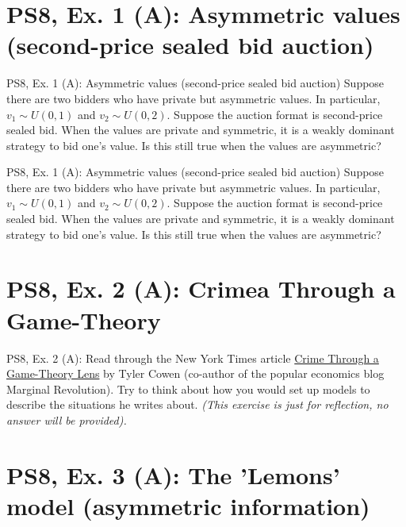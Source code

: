 \section{PS8, Ex. 1 (A): Asymmetric values (second-price sealed bid auction)}

\begin{frame}{PS8, Ex. 1 (A): Asymmetric values (second-price sealed bid auction)}
    Suppose there are two bidders who have private but asymmetric values. In particular, $v_1\sim U(0, 1)$ and $v_2\sim U(0, 2)$. Suppose the auction format is second-price sealed bid. When the values are private and symmetric, it is a weakly dominant strategy to bid one’s value. Is this still true when the values are asymmetric?
\end{frame}

\begin{frame}{PS8, Ex. 1 (A): Asymmetric values (second-price sealed bid auction)}
    Suppose there are two bidders who have private but asymmetric values. In particular, $v_1\sim U(0, 1)$ and $v_2\sim U(0, 2)$. Suppose the auction format is second-price sealed bid. When the values are private and symmetric, it is a weakly dominant strategy to bid one’s value. Is this still true when the values are asymmetric?
    \begin{multicols}{2}
      \vfill\null\columnbreak
      \vfill\null
    \end{multicols}
\end{frame}



\section{PS8, Ex. 2 (A): Crimea Through a Game-Theory }

\begin{frame}{PS8, Ex. 2 (A): }
    Read through the New York Times article \href{https://www.nytimes.com/2014/03/16/business/crimea-through-a-game-theory-lens.html}{Crime Through a Game-Theory Lens} by Tyler Cowen (co-author of the popular economics blog Marginal Revolution). Try to think about how you would set up models to describe the situations he writes about. \textit{(This exercise is just for reflection, no answer will be provided).}
\end{frame}



\section{PS8, Ex. 3 (A): The 'Lemons' model (asymmetric information)}


